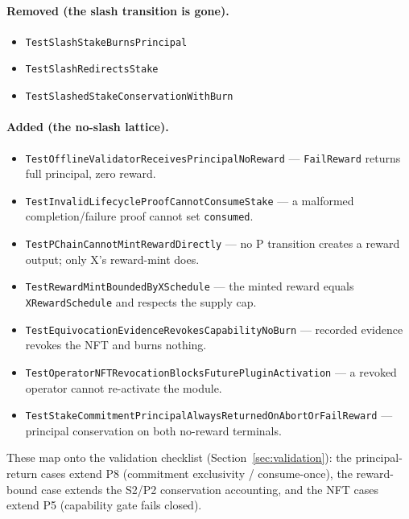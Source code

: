 \paragraph{Removed (the slash transition is gone).}
\begin{itemize}[leftmargin=2em,nosep]
\item \texttt{TestSlashStakeBurnsPrincipal}
\item \texttt{TestSlashRedirectsStake}
\item \texttt{TestSlashedStakeConservationWithBurn}
\end{itemize}

\paragraph{Added (the no-slash lattice).}
\begin{itemize}[leftmargin=2em,nosep]
\item \texttt{TestOfflineValidatorReceivesPrincipalNoReward} ---
  \texttt{FailReward} returns full principal, zero reward.
\item \texttt{TestInvalidLifecycleProofCannotConsumeStake} --- a malformed
  completion/failure proof cannot set \texttt{consumed}.
\item \texttt{TestPChainCannotMintRewardDirectly} --- no P transition
  creates a reward output; only X's reward-mint does.
\item \texttt{TestRewardMintBoundedByXSchedule} --- the minted reward
  equals \texttt{XRewardSchedule} and respects the supply cap.
\item \texttt{TestEquivocationEvidenceRevokesCapabilityNoBurn} ---
  recorded evidence revokes the NFT and burns nothing.
\item \texttt{TestOperatorNFTRevocationBlocksFuturePluginActivation} ---
  a revoked operator cannot re-activate the module.
\item \texttt{TestStakeCommitmentPrincipalAlwaysReturnedOnAbortOrFailReward}
  --- principal conservation on both no-reward terminals.
\end{itemize}

\noindent These map onto the validation checklist
(Section~\ref{sec:validation}): the principal-return cases extend P8
(commitment exclusivity / consume-once), the reward-bound case extends
the S2/P2 conservation accounting, and the NFT cases extend P5
(capability gate fails closed).
